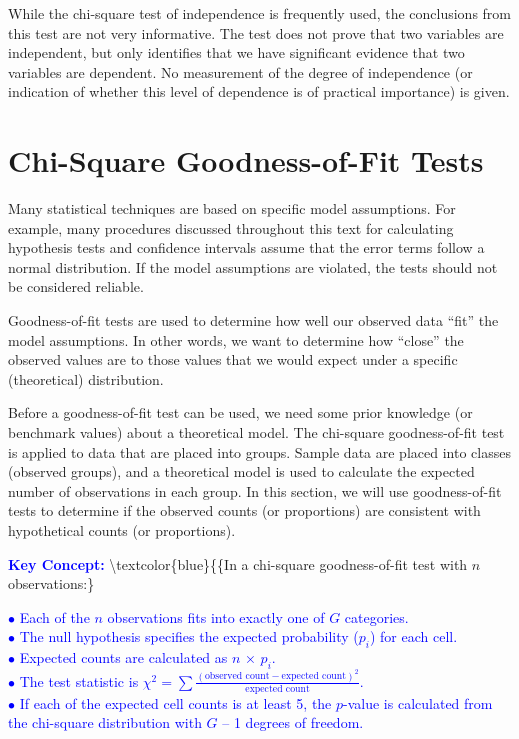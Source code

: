 \documentclass[
]{book}
\begin{document}
While the chi-square test of independence is frequently used, the conclusions from this test are not very informative. The test does not prove that two variables are independent, but only identifies that we have significant evidence that two variables are dependent. No measurement of the degree of independence (or indication of whether this level of dependence is of practical importance) is given.

\hypertarget{chi-square-goodness-of-fit-tests}{%
\section{Chi-Square Goodness-of-Fit Tests}\label{chi-square-goodness-of-fit-tests}}

Many statistical techniques are based on specific model assumptions. For example, many procedures discussed throughout this text for calculating hypothesis tests and confidence intervals assume that the error terms follow a normal distribution. If the model assumptions are violated, the tests should not be considered reliable.

Goodness-of-fit tests are used to determine how well our observed data ``fit'' the model assumptions. In other words, we want to determine how ``close'' the observed values are to those values that we would expect under a specific (theoretical) distribution.

Before a goodness-of-fit test can be used, we need some prior knowledge (or benchmark values) about a theoretical model. The chi-square goodness-of-fit test is applied to data that are placed into groups. Sample data are placed into classes (observed groups), and a theoretical model is used to calculate the expected number of observations in each group. In this section, we will use goodness-of-fit tests to determine if the observed counts (or proportions) are consistent with hypothetical counts (or proportions).

\textbf{\textcolor{blue}{Key Concept:}}
\textbackslash textcolor\{blue\}\{\{In a chi-square goodness-of-fit test with \(n\) observations:\}

\textcolor{blue}{$\bullet$ Each of the $n$ observations fits into exactly one of $G$ categories.}\\
\textcolor{blue}{$\bullet$ The null hypothesis specifies the expected probability ($p_i$) for each cell.}\\
\textcolor{blue}{$\bullet$ Expected counts are calculated as $n$ × $p_i$.}\\
\textcolor{blue}{$\bullet$ The test statistic is $\chi^2 = \sum \frac{(\text{observed count} - \text{expected count})^2}{\text{expected count}}$.}\\
\textcolor{blue}{$\bullet$ If each of the expected cell counts is at least 5, the $p$-value is calculated from the chi-square distribution with $G$ – 1 degrees of freedom.}
\end{document}
